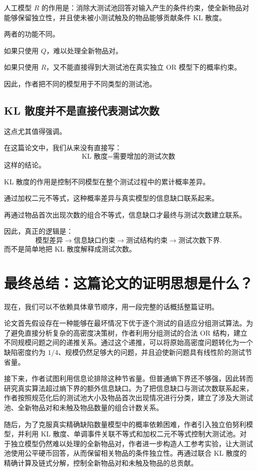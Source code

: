 \documentclass[UTF8,11pt]{ctexart}
\begin{document}
人工模型 $R$ 的作用是：消除大测试池回答对输入产生的条件约束，使全新物品对能够保留独立性，并且使未被小测试触及的物品能够贡献条件 KL 散度。

两者的功能不同。

如果只使用 $Q$，难以处理全新物品对。

如果只使用 $R$，又不能直接得到大测试池在真实独立 OR 模型下的概率约束。

因此，作者把不同的模型用于不同类型的测试池。

\subsection{KL 散度并不是直接代表测试次数}
这点尤其值得强调。

在这篇论文中，我们从来没有直接写：
\[\text{KL 散度}=\text{需要增加的测试次数}\]
这样的结论。

KL 散度的作用是控制不同模型在整个测试过程中的累计概率差异。

通过加权二元不等式，这种概率差异与真实模型的信息缺口联系起来。

再通过物品首次出现次数的组合不等式，信息缺口才最终与测试次数建立联系。

因此，真正的逻辑是：
\[
\boxed{\text{模型差异}\longrightarrow\text{信息缺口约束}\longrightarrow\text{测试结构约束}\longrightarrow\text{测试次数下界}.}
\]
而不是简单地把 KL 散度解释成测试次数。

\section{最终总结：这篇论文的证明思想是什么？}
现在，我们可以不依赖具体章节顺序，用一段完整的话概括整篇证明。

论文首先假设存在一种能够在最坏情况下优于逐个测试的自适应分组测试算法。为了避免直接分析复杂的高密度决策树，作者利用分组测试的合法 OR 结构，建立不同规模问题之间的递推关系。通过这个递推，可以将原始高密度问题转化为一个缺陷密度约为 $1/4$、规模仍然足够大的问题，并且迫使新问题具有线性阶的测试节省量。

接下来，作者试图利用信息论排除这种节省量。但普通熵下界还不够强，因此转而研究真实算法超过熵下界的额外信息缺口。为了把信息缺口与测试次数联系起来，作者按照规范化后的测试池大小及物品首次出现情况进行分类，建立了涉及大测试池、全新物品对和未触及物品数量的组合计数关系。

随后，为了克服真实精确缺陷数量模型中的概率依赖困难，作者引入独立伯努利模型，并利用 KL 散度、单调事件关联不等式和加权二元不等式控制大测试池。对于独立模型仍然难以处理的全新物品对，作者进一步构造人工参考实验，让大测试池使用公平硬币回答，从而保留相关物品的条件独立性。再通过联合 KL 散度的精确计算及链式分解，控制全新物品对和未触及物品的总贡献。
\end{document}
